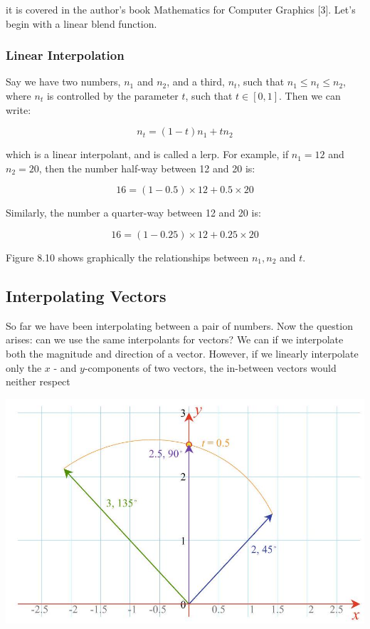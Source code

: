 \documentclass[10pt]{article}
\begin{document}
it is covered in the author's book Mathematics for Computer Graphics [3]. Let's begin with a linear blend function.

\subsubsection{Linear Interpolation}
Say we have two numbers, $n_{1}$ and $n_{2}$, and a third, $n_{t}$, such that $n_{1} \leq n_{t} \leq n_{2}$, where $n_{t}$ is controlled by the parameter $t$, such that $t \in[0,1]$. Then we can write:

$$
n_{t}=(1-t) n_{1}+t n_{2}
$$

which is a linear interpolant, and is called a lerp. For example, if $n_{1}=12$ and $n_{2}=20$, then the number half-way between 12 and 20 is:

$$
16=(1-0.5) \times 12+0.5 \times 20
$$

Similarly, the number a quarter-way between 12 and 20 is:

$$
16=(1-0.25) \times 12+0.25 \times 20
$$

Figure 8.10 shows graphically the relationships between $n_{1}, n_{2}$ and $t$.

\subsection{Interpolating Vectors}
So far we have been interpolating between a pair of numbers. Now the question arises: can we use the same interpolants for vectors? We can if we interpolate both the magnitude and direction of a vector. However, if we linearly interpolate only the $x$ - and $y$-components of two vectors, the in-between vectors would neither respect

\begin{center}
\includegraphics[max width=\textwidth]{2023_04_20_41f1ceac5a31dc7d1b59g-164}
\end{center}
\end{document}
